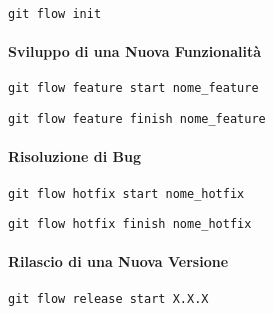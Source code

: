 \begin{lstlisting}[style=code]
    git flow init
    \end{lstlisting}
    
    \paragraph*{Sviluppo di una Nuova Funzionalità}
    
    \begin{lstlisting}[style=code]
    git flow feature start nome_feature
    \end{lstlisting}
    
    
    \begin{lstlisting}[style=code]
    git flow feature finish nome_feature
    \end{lstlisting}
    
    \paragraph*{Risoluzione di Bug}
    
    \begin{lstlisting}[style=code]
    git flow hotfix start nome_hotfix
    \end{lstlisting}
    
    
    \begin{lstlisting}[style=code]
    git flow hotfix finish nome_hotfix
    \end{lstlisting}
    
    \paragraph*{Rilascio di una Nuova Versione}
    
    \begin{lstlisting}[style=code]
    git flow release start X.X.X
    \end{lstlisting}
    
    
